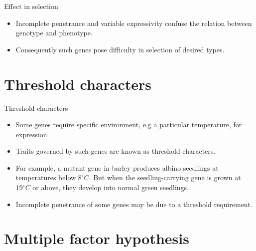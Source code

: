 \documentclass[11pt,ignorenonframetext,aspectratio=169]{beamer}
\providecommand{\tightlist}{%
  \setlength{\itemsep}{0pt}\setlength{\parskip}{0pt}}
\begin{document}
\begin{frame}{Effect in selection}
\protect\hypertarget{effect-in-selection}{}
\begin{itemize}
\tightlist
\item
  Incomplete penetrance and variable expressivity confuse the relation
  between genotype and phenotype.
\item
  Consequently such genes pose difficulty in selection of desired types.
\end{itemize}
\end{frame}

\hypertarget{threshold-characters}{%
\section{Threshold characters}\label{threshold-characters}}

\begin{frame}{Threshold characters}
\begin{itemize}
\tightlist
\item
  Some genes require specific environment, e.g a particular temperature,
  for expression.
\item
  Traits governed by such genes are known as threshold characters.
\item
  For example, a mutant gene in barley produces albino seedlings at
  temperatures below \(8^\circ C\). But when the seedling-carrying gene
  is grown at \(19^\circ C\) or above, they develop into normal green
  seedlings.
\item
  Incomplete penetrance of some genes may be due to a threshold
  requirement.
\end{itemize}
\end{frame}

\hypertarget{multiple-factor-hypothesis}{%
\section{Multiple factor hypothesis}\label{multiple-factor-hypothesis}}
\end{document}
